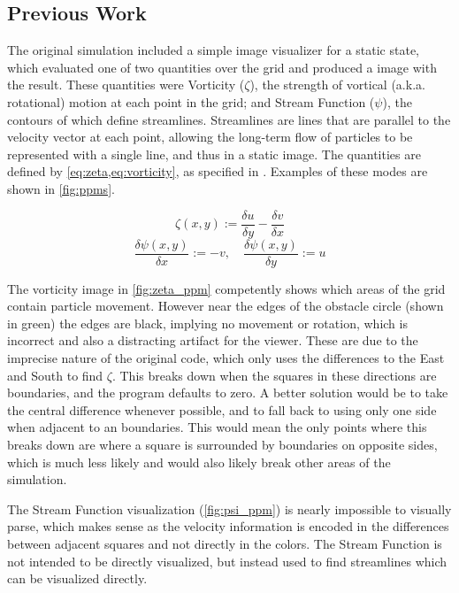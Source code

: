 \subsection{Previous Work}\label{sec:Research:Viz:ACA}
The original simulation\cite{modules:CS257Coursework} included a simple image visualizer for a static state, which evaluated one of two quantities over the grid and produced a  image with the result.
These quantities were Vorticity ($\zeta$), the strength of vortical (a.k.a. rotational) motion at each point in the grid; and Stream Function ($\psi$), the contours of which define streamlines.
Streamlines are lines that are parallel to the velocity vector at each point, allowing the long-term flow of particles to be represented with a single line, and thus in a static image.\cite{NASADefinitionStreamlines}
The quantities are defined by \cref{eq:zeta,eq:vorticity}, as specified in \cite{book:griebel1998numerical}.
Examples of these modes are shown in \cref{fig:ppms}.

\begin{equation}
    \zeta(x,y) := \frac{\delta{u}}{\delta{y}} - \frac{\delta{v}}{\delta{x}}
    \label{eq:zeta}
\end{equation}
\begin{equation}
    \frac{\delta{\psi}(x,y)}{\delta{x}} := -v,\quad \frac{\delta{\psi}(x,y)}{\delta{y}} := u
    \label{eq:vorticity}
\end{equation}


The vorticity image in \cref{fig:zeta_ppm} competently shows which areas of the grid contain particle movement.
However near the edges of the obstacle circle (shown in green) the edges are black, implying no movement or rotation, which is incorrect and also a distracting artifact for the viewer.
These are due to the imprecise nature of the original code, which only uses the differences to the East and South to find $\zeta$.
This breaks down when the squares in these directions are boundaries, and the program defaults to zero.
A better solution would be to take the central difference whenever possible, and to fall back to using only one side when adjacent to an boundaries.
This would mean the only points where this breaks down are where a square is surrounded by boundaries on opposite sides, which is much less likely and would also likely break other areas of the simulation.

The Stream Function visualization (\cref{fig:psi_ppm}) is nearly impossible to visually parse, which makes sense as the velocity information is encoded in the differences between adjacent squares and not directly in the colors.
The Stream Function is not intended to be directly visualized, but instead used to find streamlines which can be visualized directly.

